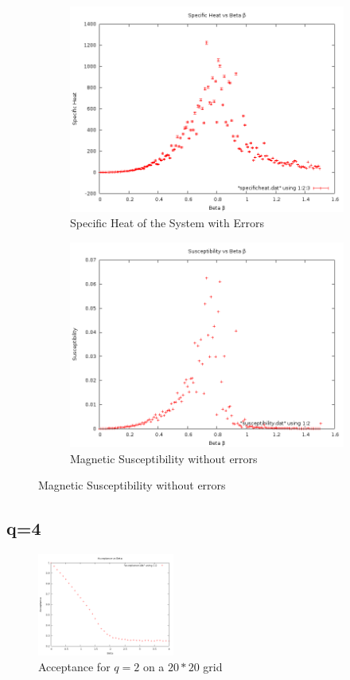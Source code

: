 \documentclass[12pt,a4paper,notitlepage,twoside]{article}
\begin{document}
\begin{figure}[H]
\centering
	\begin{subfigure}[b]{0.45\textwidth}
		\includegraphics[width=\textwidth]{q2d20/specificheat.png}	
		\caption{Specific Heat of the System with Errors}
	\end{subfigure}
	\begin{subfigure}[b]{0.45\textwidth}
		\includegraphics[width=\textwidth]{q2d20/susceptibility.png}
		\caption{Magnetic Susceptibility without errors}
	\end{subfigure}
\end{figure}

\subsection{q=4}
\begin{figure}[H]
\centering
\includegraphics[width=0.4\textwidth]{q4d20/acceptance.png}
\caption{Acceptance for $q=2$ on a $20*20$ grid}
\end{figure}
\end{document}
